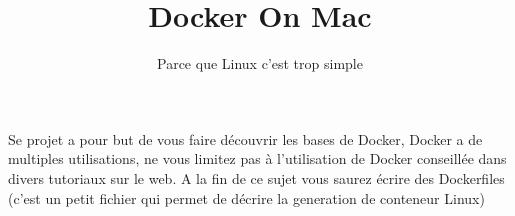 \documentclass{42}
\begin{document}
\title{Docker On Mac}
\subtitle{Parce que Linux c'est trop simple}


\summary
{
	Se projet a pour but de vous faire découvrir les bases de Docker, Docker a de multiples utilisations, ne vous limitez pas à l’utilisation de Docker conseillée dans divers tutoriaux sur le web.
	A la fin de ce sujet vous saurez écrire des Dockerfiles (c’est un petit fichier qui permet de décrire la generation de conteneur Linux)
}

\maketitle

\tableofcontents

\end{document}

